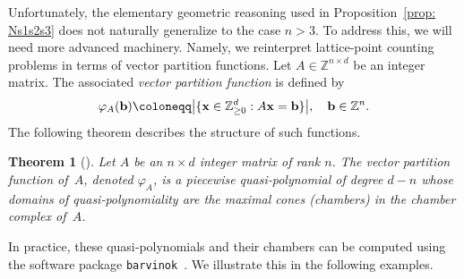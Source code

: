 \documentclass[12pt,a4paper]{extarticle}
\newtheorem{theorem}{Theorem}[section]
\theoremstyle{definition}
\begin{document}
Unfortunately, the elementary geometric reasoning used in Proposition~\ref{prop: Ns1s2s3} does not na\-turally generalize to the case $n>3$. To address this, we will need more advanced machinery.
Namely, we reinterpret lattice-point counting problems in terms of vector partition functions.
Let $A\in\mathbb{Z}^{n\times d}$ be an integer matrix.  
The associated \emph{vector partition function} is defined by
\begin{equation}\label{eq: defVectorPart}
\varphi_A({\bf b})
\coloneqq\bigl|\{{\bf x}\in\mathbb{Z}_{\ge0}^d : A{\bf x}={\bf b}\}\bigr|,
\quad {\bf b}\in\mathbb{Z}^n.    
\end{equation}
The following theorem describes the structure of such functions.
\begin{theorem}[\cite{STURMFELS1995302}]
    Let $A$ be an $n \times d$ integer matrix of rank $n$. The vector partition function of~$A$, denoted $\varphi_A$, is a piecewise quasi‑polynomial of degree $d-n$ whose domains of quasi‑polynomiality are the maximal cones (chambers) in the chamber complex of~$A$.
\end{theorem}
In practice, these quasi‑polynomials and their chambers can be computed using the software
package \texttt{barvinok}~\cite{Verdoolaege2007}. We illustrate this in the following examples.
\end{document}
